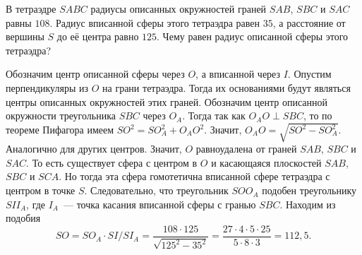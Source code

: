 В тетраэдре $SABC$ радиусы описанных окружностей граней $SAB$, $SBC$ и $SAC$
равны $108$.
Радиус вписанной сферы этого тетраэдра равен $35$, а расстояние от вершины $S$
до её центра равно $125$.
Чему равен радиус описанной сферы этого тетраэдра?

\solution
Обозначим центр описанной сферы через $O$, а вписанной через $I$.
Опустим перпендикуляры из $O$ на грани тетраэдра.
Тогда их основаниями будут являться центры описанных окружностей этих граней.
Обозначим центр описанной окружности треугольника $SBC$ через $O_A$.
Тогда так как $O_AO \perp SBC$, то по теореме Пифагора имеем
$SO^2 = SO_A^2 + O_AO^2$.
Значит, $O_AO = \sqrt{SO^2 - SO_A^2}$.
Аналогично для других центров.
Значит, $O$ равноудалена от граней $SAB$, $SBC$ и $SAC$.
То есть существует сфера с центром в $O$ и касающаяся плоскостей
$SAB$, $SBC$ и $SCA$.
Но тогда эта сфера гомотетична вписанной сфере тетраэдра с центром в точке $S$.
Следовательно, что треугольник $SOO_A$ подобен треугольнику $SII_A$,
где $I_A$~--- точка касания вписанной сферы с гранью $SBC$.
Находим из подобия
\[
    SO
=
    SO_A \cdot SI / SI_A
=
    \dfrac{108 \cdot 125}{\sqrt{125^2 - 35^2}}
=
    \dfrac{27 \cdot 4 \cdot 5 \cdot 25}{5 \cdot 8 \cdot 3}
=
    112{,}5
.\]

